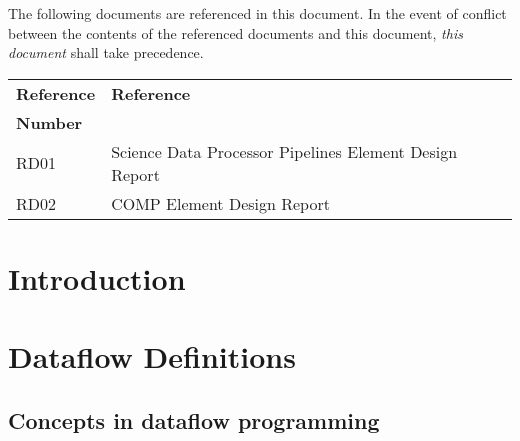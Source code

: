\documentclass[11pt,a4paper]{article}
\begin{document}
The following documents are referenced in this document. In the event of
conflict between the contents of the referenced documents and this document,
\emph{this document} shall take precedence.

\begin{center}{
\begin{tabularx}{\textwidth}{|X|X|}
    \hline
    \bf{Reference} & \bf{Reference}\\
    \bf{Number} & \\
    \hline
    RD01 & Science Data Processor Pipelines Element Design Report\\\hline
    RD02 & COMP Element Design Report\\\hline
  \end{tabularx}}
\end{center}

\fi

\newpage
\section{Introduction}

\section{Dataflow Definitions}
\label{sec:dataflow-definitions}

\subsection{Concepts in dataflow programming}
\end{document}
